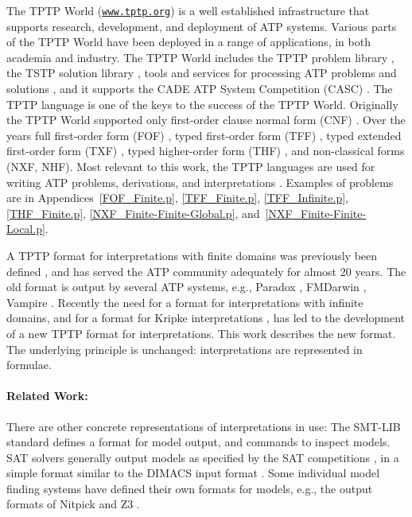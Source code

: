 \documentclass{easychair}
\begin{document}
The TPTP World \cite{Sut17} (\href{https://www.tptp.org}{\tt www.tptp.org}) is a well established 
infrastructure that supports research, development, and deployment of 
ATP systems.
Various parts of the TPTP World have been deployed in a range of applications, in both academia 
and industry.
The TPTP World includes the TPTP problem library \cite{Sut09}, 
the TSTP solution library \cite{Sut10}, 
tools and services for processing ATP problems and solutions \cite{Sut10}, 
and it supports the CADE ATP System Competition (CASC) \cite{Sut16}.
The TPTP language \cite{Sut23-IGPL} is one of the keys to the success of the TPTP World.
Originally the TPTP World supported only first-order clause normal form (CNF)
\cite{SS98-JAR}.
Over the years full first-order form (FOF)
\cite{Sut09}, 
typed first-order form (TFF)
\cite{SS+12,BP13-TFF1}, 
typed extended first-order form (TXF)
\cite{SK18}, 
typed higher-order form (THF)
\cite{SB10,KSR16}, 
and non-classical forms (NXF, NHF).
Most relevant to this work, the TPTP languages are used for writing ATP problems, 
derivations, and interpretations \cite{SS+06,Sut08-KEAPPA}.
Examples of problems are in Appendices~\ref{FOF_Finite.p}, \ref{TFF_Finite.p},
\ref{TFF_Infinite.p}, \ref{THF_Finite.p}, \ref{NXF_Finite-Finite-Global.p}, 
and~\ref{NXF_Finite-Finite-Local.p}.

A TPTP format for interpretations with finite domains was previously been defined \cite{SS+06},
and has served the ATP community adequately for almost 20 years. 
The old format is output by several ATP systems, e.g., Paradox \cite{CS03}, FMDarwin \cite{BF+06}, 
Vampire \cite{KV13}.
Recently the need for a format for interpretations with infinite domains, and for a format for 
Kripke interpretations \cite{Kri63}, has led to the development of a new TPTP format for 
interpretations.
This work describes the new format.
The underlying principle is unchanged: interpretations are represented in formulae.

\paragraph{Related Work:}
There are other concrete representations of interpretations in use:
The SMT-LIB standard \cite{BFT17} defines a format for model output, and commands to inspect 
models.  
SAT solvers generally output models as specified by the SAT competitions \cite{JL+12}, in a 
simple format similar to the DIMACS input format \cite{Bab93}.
Some individual model finding systems have defined their own formats for models, e.g., the 
output formats of Nitpick and Z3 \cite{dMB08}.
\end{document}
